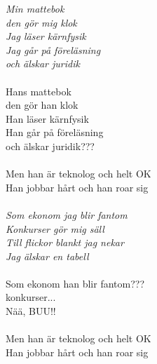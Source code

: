 \newpage


\noindent\textit{Min mattebok \\
den gör mig klok\\
Jag läser kärnfysik\\
Jag går på föreläsning\\
och älskar juridik}\\\\
\noindent Hans mattebok\\
den gör han klok\\
Han läser kärnfysik\\
Han går på föreläsning\\
och älskar juridik???\\\\
\noindent Men han är teknolog och helt OK\\
Han jobbar hårt och han roar sig\\\\
\noindent\textit{Som ekonom jag blir fantom\\
Konkurser gör mig säll\\
Till flickor blankt jag nekar\\
Jag älskar en tabell}\\\\
\noindent Som ekonom han blir fantom???\\
konkurser...\\
Nää, BUU!!\\\\
\noindent Men han är teknolog och helt OK\\
Han jobbar hårt och han roar sig\\


\newpage


